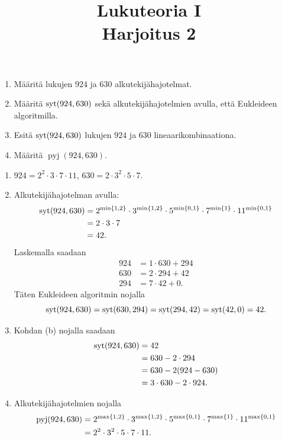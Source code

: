 \documentclass[11pt,a4paper]{amsart}
\title{Lukuteoria I\\Harjoitus 2}
\author{}
\date{}
\begin{document}

\begin{exercise}
  \leavevmode\par
  \begin{enumerate}[label=(\alph*), nosep]
    \item Määritä lukujen \(924\) ja \(630\) alkutekijähajotelmat.
    \item Määritä \(\operatorname{syt}(924, 630)\) sekä alkutekijähajotelmien avulla, että
      Eukleideen algoritmilla.
    \item Esitä \(\operatorname{syt}(924, 630)\) lukujen \(924\) ja \(630\)
      lineaarikombinaationa.
    \item Määritä \(\operatorname{pyj}(924, 630)\).
  \end{enumerate}
\end{exercise}

\begin{solution}
  \leavevmode\par
  \begin{enumerate}[label=(\alph*), nosep]
    \item \(924 = 2^2 \cdot 3 \cdot 7 \cdot 11\), \(630 = 2 \cdot 3^2
      \cdot 5 \cdot 7\).
    \item Alkutekijähajotelman avulla:
      \[
        \begin{aligned}
          \operatorname{syt}(924, 630) &= 2^{\min\left\lbrace1, 2\right\rbrace} \cdot 3^{\min\left\lbrace1, 2\right\rbrace}
          \cdot 5^{\min\left\lbrace0, 1\right\rbrace}
          \cdot 7^{\min\left\lbrace1\right\rbrace} \cdot 11^{\min\left\lbrace0, 1\right\rbrace} \\
          &= 2 \cdot 3 \cdot 7 \\
          &= 42.
        \end{aligned}
      \]
      Laskemalla saadaan
      \[
        \begin{aligned}
          924 &= 1 \cdot 630 + 294 \\
          630 &= 2 \cdot 294 + 42 \\
          294 &= 7 \cdot 42 + 0.
        \end{aligned}
      \]
      Täten Eukleideen algoritmin nojalla
      \[
        \operatorname{syt}(924, 630) = \operatorname{syt}(630, 294) = \operatorname{syt}(294, 42) = \operatorname{syt}(42, 0) = 42.
      \]
    \item Kohdan (b) nojalla saadaan
      \[
        \begin{aligned}
          \operatorname{syt}(924, 630) &= 42 \\
          &= 630 - 2 \cdot 294 \\
          &= 630 - 2(924 - 630) \\
          &= 3 \cdot 630 - 2 \cdot 924.
        \end{aligned}
      \]
    \item Alkutekijähajotelmien nojalla
      \[
        \begin{aligned}
          \operatorname{pyj}(924, 630) &= 2^{\max\left\lbrace1, 2\right\rbrace} \cdot 3^{\max\left\lbrace1, 2\right\rbrace}
          \cdot 5^{\max\left\lbrace0, 1\right\rbrace}
          \cdot 7^{\max\left\lbrace1\right\rbrace} \cdot 11^{\max\left\lbrace0, 1\right\rbrace} \\
          &= 2^2 \cdot 3^2 \cdot 5 \cdot 7 \cdot 11.
        \end{aligned}
      \]
  \end{enumerate}
\end{solution}
\end{document}
